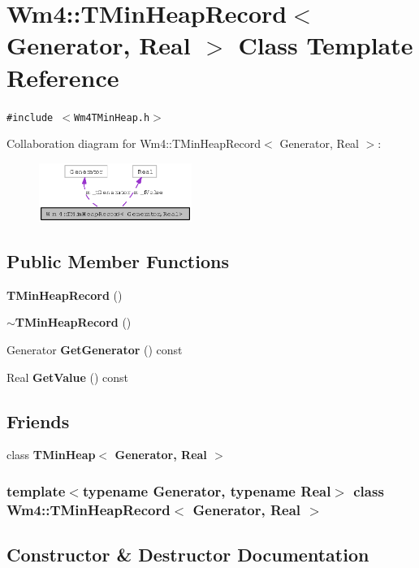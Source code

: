 \section{Wm4::TMin\-Heap\-Record$<$ Generator, Real $>$ Class Template Reference}
\label{classWm4_1_1TMinHeapRecord}
{\tt \#include $<$Wm4TMin\-Heap.h$>$}

Collaboration diagram for Wm4::TMin\-Heap\-Record$<$ Generator, Real $>$:\begin{figure}[H]
\begin{center}
\leavevmode
\includegraphics[width=141pt]{classWm4_1_1TMinHeapRecord__coll__graph}
\end{center}
\end{figure}
\subsection*{Public Member Functions}
\begin{CompactItemize}
\item 
{\bf TMin\-Heap\-Record} ()
\item 
{\bf $\sim$TMin\-Heap\-Record} ()
\item 
Generator {\bf Get\-Generator} () const
\item 
Real {\bf Get\-Value} () const
\end{CompactItemize}
\subsection*{Friends}
\begin{CompactItemize}
\item 
class {\bf TMin\-Heap$<$ Generator, Real $>$}
\end{CompactItemize}
\subsubsection*{template$<$typename Generator, typename Real$>$ class Wm4::TMin\-Heap\-Record$<$ Generator, Real $>$}



\subsection{Constructor \& Destructor Documentation}
